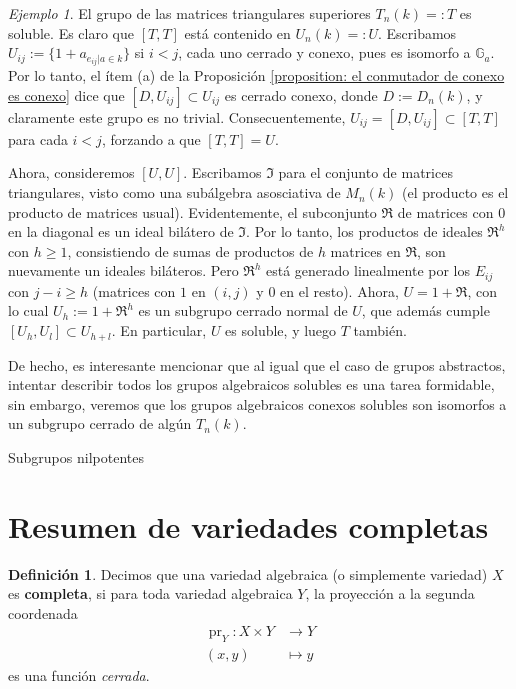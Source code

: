 \documentclass[spanish,10pt]{amsart}
\makeatletter
\renewcommand\subsection{\@startsection{subsection}{2}%
  \z@{.5\linespacing\@plus.7\linespacing}{-.5em}%
  {\normalfont\sffamily}}
\theoremstyle{definition}
\newtheorem{definition}[theorem]{Definición}
\theoremstyle{remark}
\newtheorem{example}[theorem]{Ejemplo}
\numberwithin{equation}{section}
\makeatother
\begin{document}
\begin{example}
El grupo de las matrices triangulares superiores $T_n (k)=:T$ es soluble. Es claro que $[T,T]$ está contenido en $U_n (k) =: U$. Escribamos $U_{ij} := \{1 + a_{e_{ij} | a \in k}\}$ si $i < j$, cada uno cerrado y conexo, pues es isomorfo a $\mathbb{G}_a$. Por lo tanto, el ítem (a) de la Proposición \ref{proposition: el conmutador de conexo es conexo} dice que $[D, U_{ij}] \subset U_{ij}$ es cerrado conexo, donde $D := D_n (k)$, y claramente este grupo es no trivial. Consecuentemente, $U_{ij} = [D, U_{ij}] \subset [T,T]$ para cada $i<j$, forzando a que $[T,T] = U$.

Ahora, consideremos $[U,U]$. Escribamos $\mathfrak I$ para el conjunto de matrices triangulares, visto como una subálgebra asosciativa de $M_n (k)$ (el producto es el producto de matrices usual). Evidentemente, el subconjunto $\mathfrak R$ de matrices con $0$ en la diagonal es un ideal bilátero de $\mathfrak I$. Por lo tanto, los productos de ideales $\mathfrak R^h$ con $h \geq 1$, consistiendo de sumas de productos de $h$ matrices en $\mathfrak R$, son nuevamente un ideales biláteros. Pero $\mathfrak R^h$ está generado linealmente por los $E_{ij}$ con $j - i \geq h$ (matrices con $1$ en $(i,j)$ y $0$ en el resto). Ahora, $U = 1 + \mathfrak R$, con lo cual $U_h := 1 + \mathfrak R^h$ es un subgrupo cerrado normal de $U$, que además cumple $[U_h, U_l] \subset U_{h+ l}$. En particular, $U$ es soluble, y luego $T$ también.
\end{example}

De hecho, es interesante mencionar que al igual que el caso de grupos abstractos, intentar describir todos los grupos algebraicos solubles es una tarea formidable, sin embargo, veremos que los grupos algebraicos conexos solubles son isomorfos a un subgrupo cerrado de algún $T_n (k)$.


\subsection{Subgrupos nilpotentes}










\section{Resumen de variedades completas}

\begin{definition}
Decimos que una variedad algebraica (o simplemente variedad) $X$ es \textbf{completa}, si para toda variedad algebraica $Y$, la proyección a la segunda coordenada
\begin{align*}
\operatorname{pr}_Y : X \times Y &\longrightarrow Y \\
(x,y) &\longmapsto y
\end{align*}
es una función \textit{cerrada}.
\end{definition}
\end{document}

